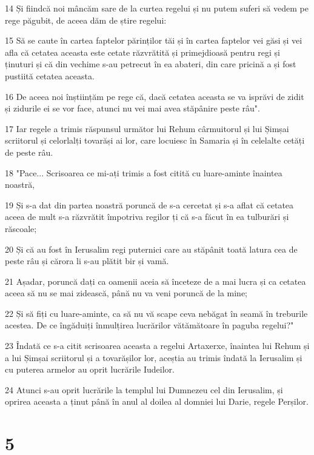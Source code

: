 \par 14 Și fiindcă noi mâncăm sare de la curtea regelui și nu putem suferi să vedem pe rege păgubit, de aceea dăm de știre regelui:
\par 15 Să se caute în cartea faptelor părinților tăi și în cartea faptelor vei găsi și vei afla că cetatea aceasta este cetate răzvrătită și primejdioasă pentru regi și ținuturi și că din vechime s-au petrecut în ea abateri, din care pricină a și fost pustiită cetatea aceasta.
\par 16 De aceea noi înștiințăm pe rege că, dacă cetatea aceasta se va isprăvi de zidit și zidurile ei se vor face, atunci nu vei mai avea stăpânire peste râu".
\par 17 Iar regele a trimis răspunsul următor lui Rehum cârmuitorul și lui Șimșai scriitorul și celorlalți tovarăși ai lor, care locuiesc în Samaria și în celelalte cetăți de peste râu.
\par 18 "Pace... Scrisoarea ce mi-ați trimis a fost citită cu luare-aminte înaintea noastră,
\par 19 Și s-a dat din partea noastră poruncă de s-a cercetat și s-a aflat că cetatea aceea de mult s-a răzvrătit împotriva regilor ți că s-a făcut în ea tulburări și răscoale;
\par 20 Și că au fost în Ierusalim regi puternici care au stăpânit toată latura cea de peste râu și cărora li s-au plătit bir și vamă.
\par 21 Așadar, poruncă dați ca oamenii aceia să înceteze de a mai lucra și ca cetatea aceea să nu se mai zidească, până nu va veni poruncă de la mine;
\par 22 Și să fiți cu luare-aminte, ca să nu vă scape ceva nebăgat în seamă în treburile acestea. De ce îngăduiți înmulțirea lucrărilor vătămătoare în paguba regelui?"
\par 23 Îndată ce s-a citit scrisoarea aceasta a regelui Artaxerxe, înaintea lui Rehum și a lui Șimșai scriitorul și a tovarășilor lor, aceștia au trimis îndată la Ierusalim și cu puterea armelor au oprit lucrările Iudeilor.
\par 24 Atunci s-au oprit lucrările la templul lui Dumnezeu cel din Ierusalim, și oprirea aceasta a ținut până în anul al doilea al domniei lui Darie, regele Perșilor.

\chapter{5}

